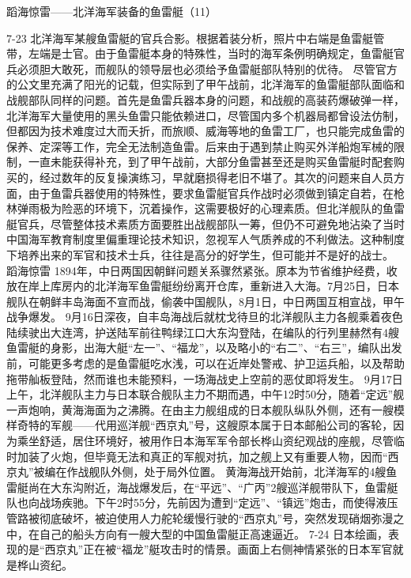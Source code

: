 \documentclass[12pt,UTF8]{ctexbook}
\begin{document}
蹈海惊雷——北洋海军装备的鱼雷艇（11）

7-23
北洋海军某艘鱼雷艇的官兵合影。根据着装分析，照片中右端是鱼雷艇管带，左端是士官。由于鱼雷艇本身的特殊性，当时的海军条例明确规定，鱼雷艇官兵必须胆大敢死，而舰队的领导层也必须给予鱼雷艇部队特别的优待。
尽管官方的公文里充满了阳光的记载，但实际到了甲午战前，北洋海军的鱼雷艇部队面临和战舰部队同样的问题。首先是鱼雷兵器本身的问题，和战舰的高装药爆破弹一样，北洋海军大量使用的黑头鱼雷只能依赖进口，尽管国内多个机器局都曾设法仿制，但都因为技术难度过大而夭折，而旅顺、威海等地的鱼雷工厂，也只能完成鱼雷的保养、定深等工作，完全无法制造鱼雷。后来由于遇到禁止购买外洋船炮军械的限制，一直未能获得补充，到了甲午战前，大部分鱼雷甚至还是购买鱼雷艇时配套购买的，经过数年的反复操演练习，早就磨损得老旧不堪了。其次的问题来自人员方面，由于鱼雷兵器使用的特殊性，要求鱼雷艇官兵作战时必须做到镇定自若，在枪林弹雨极为险恶的环境下，沉着操作，这需要极好的心理素质。但北洋舰队的鱼雷艇官兵，尽管整体技术素质方面要胜出战舰部队一筹，但仍不可避免地沾染了当时中国海军教育制度里偏重理论技术知识，忽视军人气质养成的不利做法。这种制度下培养出来的军官和技术士兵，往往是高分的好学生，但可能并不是好的战士。
蹈海惊雷
1894年，中日两国因朝鲜问题关系骤然紧张。原本为节省维护经费，收放在岸上库房内的北洋海军鱼雷艇纷纷离开仓库，重新进入大海。7月25日，日本舰队在朝鲜丰岛海面不宣而战，偷袭中国舰队，8月1日，中日两国互相宣战，甲午战争爆发。
9月16日深夜，自丰岛海战后就枕戈待旦的北洋舰队主力各舰乘着夜色陆续驶出大连湾，护送陆军前往鸭绿江口大东沟登陆，在编队的行列里赫然有4艘鱼雷艇的身影，出海大艇“左一”、“福龙”，以及略小的“右二”、“右三”，编队出发前，可能更多考虑的是鱼雷艇吃水浅，可以在近岸处警戒、护卫运兵船，以及帮助拖带舢板登陆，然而谁也未能预料，一场海战史上空前的恶仗即将发生。
9月17日上午，北洋舰队主力与日本联合舰队主力不期而遇，中午12时50分，随着“定远”舰一声炮响，黄海海面为之沸腾。在由主力舰组成的日本舰队纵队外侧，还有一艘模样奇特的军舰——代用巡洋舰“西京丸”号，这艘原本属于日本邮船公司的客轮，因为乘坐舒适，居住环境好，被用作日本海军军令部长桦山资纪观战的座舰，尽管临时加装了火炮，但毕竟无法和真正的军舰对抗，加之舰上又有重要人物，因而“西京丸”被编在作战舰队外侧，处于局外位置。
黄海海战开始前，北洋海军的4艘鱼雷艇尚在大东沟附近，海战爆发后，在“平远”、“广丙”2艘巡洋舰带队下，鱼雷艇队也向战场疾驰。下午2时55分，先前因为遭到“定远”、“镇远”炮击，而使得液压管路被彻底破坏，被迫使用人力舵轮缓慢行驶的“西京丸”号，突然发现硝烟弥漫之中，在自己的船头方向有一艘大型的中国鱼雷艇正高速逼近。
7-24
日本绘画，表现的是“西京丸”正在被“福龙”艇攻击时的情景。画面上右侧神情紧张的日本军官就是桦山资纪。
\end{document}
